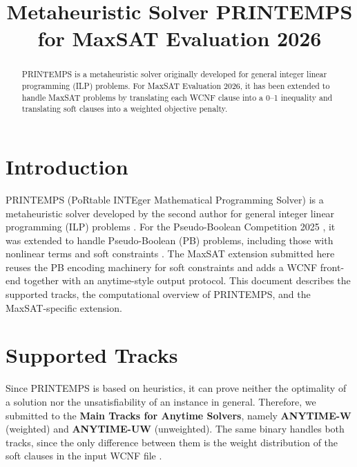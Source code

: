 \documentclass[conference]{IEEEtran}
\begin{document}
\title{\huge Metaheuristic Solver PRINTEMPS \\for MaxSAT Evaluation 2026}

\author{
\and
{}
}

\maketitle

\begin{abstract}
PRINTEMPS is a metaheuristic solver originally developed for general integer linear programming (ILP) problems. For MaxSAT Evaluation 2026, it has been extended to handle MaxSAT problems by translating each WCNF clause into a 0--1 inequality and translating soft clauses into a weighted objective penalty.
\end{abstract}

\section{Introduction}
PRINTEMPS (PoRtable INTEger Mathematical Programming Solver) is a metaheuristic solver developed by the second author for general integer linear programming (ILP) problems \cite{printemps}.
For the Pseudo-Boolean Competition 2025 \cite{pb25}, it was extended to handle Pseudo-Boolean (PB) problems, including those with nonlinear terms and soft constraints \cite{printemps-pb25}.
The MaxSAT extension submitted here reuses the PB encoding machinery for soft constraints and adds a WCNF front-end together with an anytime-style output protocol.
This document describes the supported tracks, the computational overview of PRINTEMPS, and the MaxSAT-specific extension.

\section{Supported Tracks}
Since PRINTEMPS is based on heuristics, it can prove neither the optimality of a solution nor the unsatisfiability of an instance in general.
Therefore, we submitted to the {\bf Main Tracks for Anytime Solvers}, namely {\bf ANYTIME-W} (weighted) and {\bf ANYTIME-UW} (unweighted).
The same binary handles both tracks, since the only difference between them is the weight distribution of the soft clauses in the input WCNF file \cite{mse26}.
\end{document}
